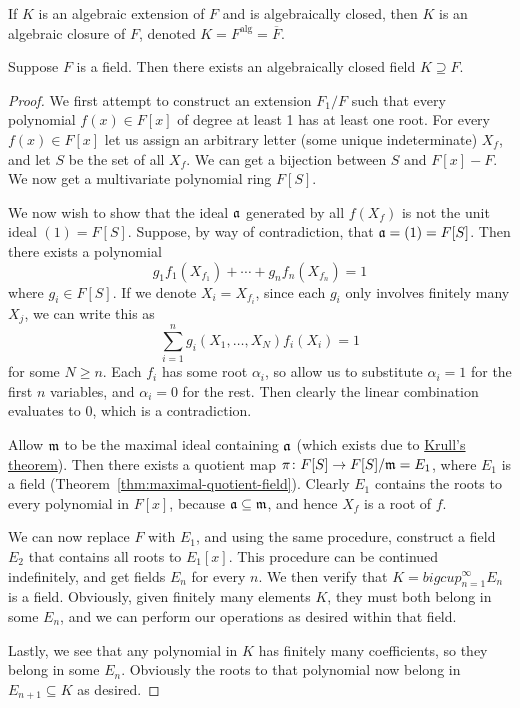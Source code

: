 \begin{definition}
    If \(K\) is an algebraic extension of \(F\) and is algebraically closed,
    then \(K\) is an algebraic closure of \(F\),
    denoted \(K = F^\text{alg} = \overline{F}\).
\end{definition}
\begin{theorem}\label{thm:existence-alg-closure}
    Suppose \(F\) is a field.
    Then there exists an algebraically closed field \(K \supseteq F\).
\end{theorem}
\begin{proof}
    We first attempt to construct an extension \(F_1/F\)
    such that every polynomial \(f(x) \in F[x]\) of degree at least 1
    has at least one root.
    For every \(f(x) \in F[x]\) let us assign an arbitrary letter
    (some unique indeterminate) \(X_f\),
    and let \(S\) be the set of all \(X_f\).
    We can get a bijection between \(S\) and \(F[x] - F\).
    We now get a multivariate polynomial ring \(F[S]\).

    We now wish to show that the ideal \(\mathfrak{a}\) generated by all \(f(X_f)\)
    is not the unit ideal \((1) = F[S]\).
    Suppose, by way of contradiction, that \(\mathfrak{a} = (1) = F[S]\).
    Then there exists a polynomial
    \begin{equation*}
        g_1 f_1(X_{f_1}) + \cdots + g_n f_n(X_{f_n}) = 1
    \end{equation*}
    where \(g_i \in F[S]\).
    If we denote \(X_i = X_{f_i}\),
    since each \(g_i\) only involves finitely many \(X_j\),
    we can write this as
    \begin{equation*}
        \sum_{i=1}^n g_i(X_1,\hdots,X_N) f_i(X_i) = 1
    \end{equation*}
    for some \(N \geq n\).
    Each \(f_i\) has some root \(\alpha_i\),
    so allow us to substitute \(\alpha_i = 1\) for the first \(n\) variables,
    and \(\alpha_i = 0\) for the rest.
    Then clearly the linear combination evaluates to 0, which is a contradiction.

    Allow \(\mathfrak{m}\) to be the maximal ideal containing \(\mathfrak{a}\)
    (which exists due to \hyperref[thm:krull]{Krull's theorem}).
    Then there exists a quotient map \(\pi\colon F[S]\to F[S]/\mathfrak{m} = E_1\),
    where \(E_1\) is a field (Theorem~\ref{thm:maximal-quotient-field}).
    Clearly \(E_1\) contains the roots to every polynomial in \(F[x]\),
    because \(\mathfrak{a} \subseteq \mathfrak{m}\), and hence \(X_f\) is a root of \(f\).

    We can now replace \(F\) with \(E_1\),
    and using the same procedure, construct a field \(E_2\) that contains all roots to \(E_1[x]\).
    This procedure can be continued indefinitely, and get fields \(E_n\) for every \(n\).
    We then verify that \(K = bigcup_{n=1}^\infty E_n\) is a field.
    Obviously, given finitely many elements \(K\), they must both belong in some \(E_n\),
    and we can perform our operations as desired within that field.

    Lastly, we see that any polynomial in \(K\) has finitely many coefficients,
    so they belong in some \(E_n\).
    Obviously the roots to that polynomial now belong in \(E_{n+1} \subseteq K\) as desired.
\end{proof}
